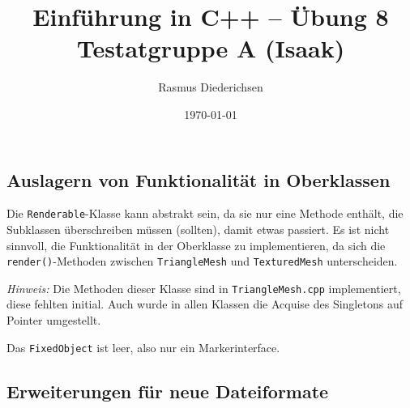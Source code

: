 \documentclass{article}
\title{Einführung in C++ -- Übung 8 \\ Testatgruppe A (Isaak)}
\author{Rasmus Diederichsen}
\date{\today}
\begin{document}
   \maketitle

   \setcounter{section}{8}

   \subsection{Auslagern von Funktionalität in Oberklassen}
   
   Die \texttt{Renderable}-Klasse kann abstrakt sein, da sie nur eine Methode
   enthält, die Subklassen überschreiben müssen (sollten), damit etwas passiert.
   Es ist nicht sinnvoll, die Funktionalität in der Oberklasse zu
   implementieren, da sich die \texttt{render()}-Methoden zwischen
   \texttt{TriangleMesh} und \texttt{TexturedMesh} unterscheiden.

   

   \emph{Hinweis:} Die Methoden dieser Klasse sind in
   \texttt{TriangleMesh.cpp} implementiert, diese fehlten initial. Auch wurde in
   allen Klassen die Acquise des Singletons auf Pointer umgestellt.

   

   Das \texttt{FixedObject} ist leer, also nur ein Markerinterface.

   

   \subsection{Erweiterungen für neue Dateiformate}
   
   
   
   
   
   
   
\end{document}
